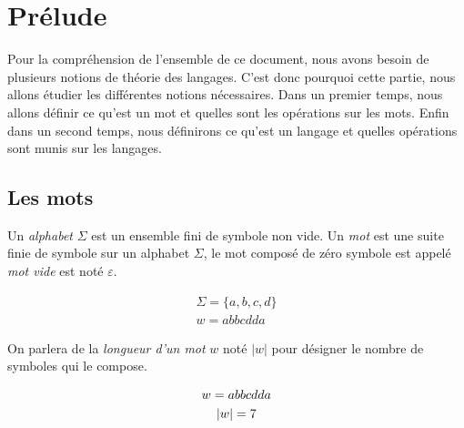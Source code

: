 \section{Prélude}

Pour la compréhension de l'ensemble de ce document, nous avons besoin de
plusieurs notions de théorie des langages. C'est donc pourquoi cette partie,
nous allons étudier les différentes notions nécessaires. Dans un premier temps,
nous allons définir ce qu'est un mot et quelles sont les opérations sur les
mots. Enfin dans un second temps, nous définirons ce qu'est un langage et
quelles opérations sont munis sur les langages.

\subsection{Les mots}

\begin{definition}
    Un \textit{alphabet} \(\Sigma\) est un ensemble fini de symbole non vide. Un
    \textit{mot} est une suite finie de symbole sur un alphabet \(\Sigma\), le mot
    composé de zéro symbole est appelé \textit{mot vide} est noté \(\varepsilon\).
\end{definition}

\begin{example}
    \begin{gather*}
        \Sigma = \{a, b, c, d\} \\
        w = abbcdda
    \end{gather*}
\end{example}

\begin{definition}
    On parlera de la \textit{longueur d'un mot} \(w\) noté \(|w|\) pour désigner le
    nombre de symboles qui le compose.
\end{definition}

\begin{example}
    \begin{gather*}
        w = abbcdda \notag \\
        |w| = 7 \\
    \end{gather*}
\end{example}

